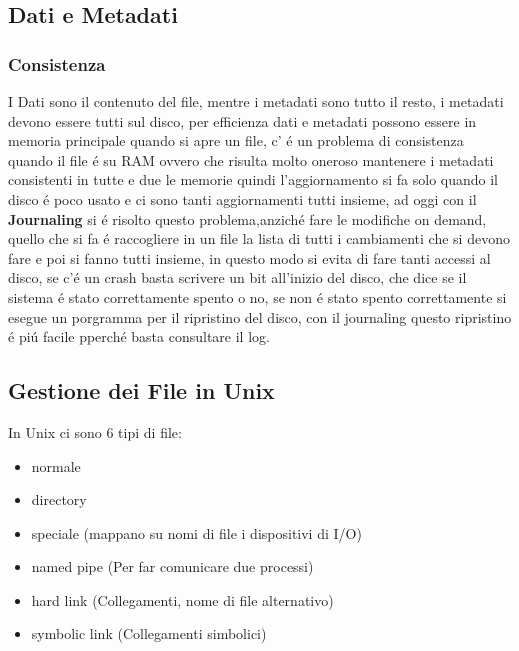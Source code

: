 \subsection{Dati e Metadati}
\subsubsection*{Consistenza}
I Dati sono il contenuto del file, mentre i metadati sono tutto il resto, i metadati devono essere tutti sul disco, per efficienza
dati e metadati possono essere in memoria principale quando si apre un file, c' é un problema di consistenza quando il file
é su RAM ovvero che risulta molto oneroso mantenere i metadati consistenti in tutte e due le memorie quindi l'aggiornamento
si fa solo quando il disco é poco usato e ci sono tanti aggiornamenti tutti insieme, ad oggi con il \textbf{Journaling} si é risolto
questo problema,anziché fare le modifiche on demand, quello che si fa é raccogliere in un file la lista di tutti i cambiamenti
che si devono fare e poi si fanno tutti insieme, in questo modo si evita di fare tanti accessi al disco, se c'é un crash
basta scrivere un bit all'inizio del disco, che dice se il sistema é stato correttamente spento o no, se non é stato spento
correttamente si esegue un porgramma per il ripristino del disco, con il journaling questo ripristino é piú facile pperché basta consultare il log.
\subsection{Gestione dei File in Unix}
In Unix ci sono 6 tipi di file:
\begin{itemize}
    \item normale
    \item directory
    \item speciale (mappano su nomi di file i dispositivi di I/O)
    \item named pipe (Per far comunicare due processi)
    \item hard link (Collegamenti, nome di file alternativo)
    \item symbolic link (Collegamenti simbolici)
\end{itemize}
